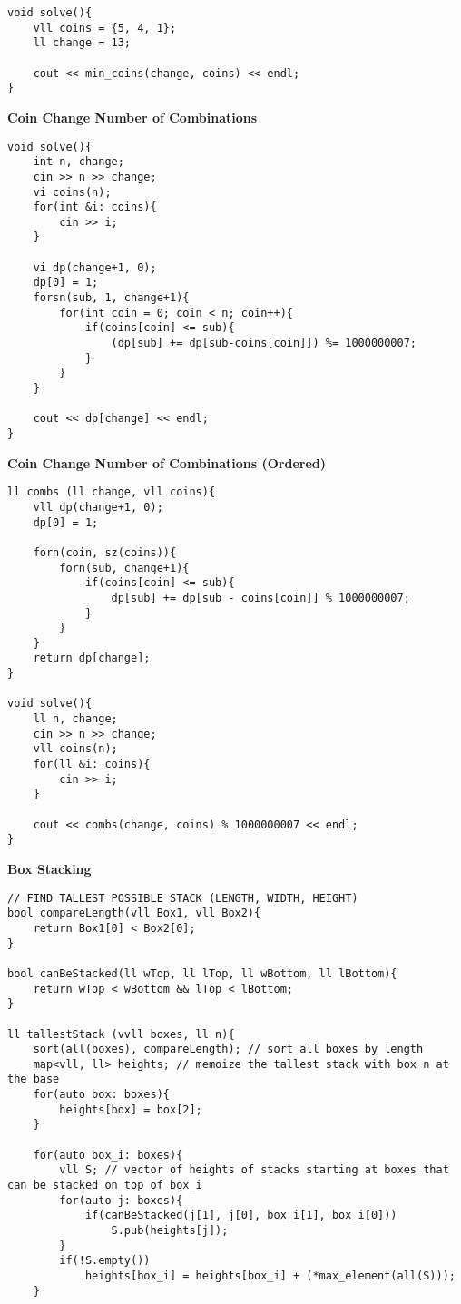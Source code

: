 \documentclass{article}
\begin{document}
\begin{multicols}{2}
\begin{lstlisting}
void solve(){
	vll coins = {5, 4, 1};
	ll change = 13; 
	
	cout << min_coins(change, coins) << endl;
}
\end{lstlisting}

\large
\huge\textbf{Coin Change Number of Combinations}
\large
\begin{lstlisting}
void solve(){
	int n, change;
	cin >> n >> change;
	vi coins(n);
	for(int &i: coins){
		cin >> i;
	}

	vi dp(change+1, 0);
	dp[0] = 1;
	forsn(sub, 1, change+1){
		for(int coin = 0; coin < n; coin++){
			if(coins[coin] <= sub){
				(dp[sub] += dp[sub-coins[coin]]) %= 1000000007;
			}
		}
	}

	cout << dp[change] << endl;
}
\end{lstlisting}

\large
\huge\textbf{Coin Change Number of Combinations (Ordered)}
\large
\begin{lstlisting}
ll combs (ll change, vll coins){
	vll dp(change+1, 0);
	dp[0] = 1;

	forn(coin, sz(coins)){
		forn(sub, change+1){
			if(coins[coin] <= sub){
				dp[sub] += dp[sub - coins[coin]] % 1000000007;
			}
		}
	}
	return dp[change];
}

void solve(){
	ll n, change;
	cin >> n >> change;
	vll coins(n);
	for(ll &i: coins){
		cin >> i;
	}

	cout << combs(change, coins) % 1000000007 << endl;
}
\end{lstlisting}

\large
\huge\textbf{Box Stacking}
\large
\begin{lstlisting}
// FIND TALLEST POSSIBLE STACK (LENGTH, WIDTH, HEIGHT)
bool compareLength(vll Box1, vll Box2){
	return Box1[0] < Box2[0];
}

bool canBeStacked(ll wTop, ll lTop, ll wBottom, ll lBottom){
	return wTop < wBottom && lTop < lBottom;
}

ll tallestStack (vvll boxes, ll n){
	sort(all(boxes), compareLength); // sort all boxes by length 
	map<vll, ll> heights; // memoize the tallest stack with box n at the base
	for(auto box: boxes){
		heights[box] = box[2];
	}

	for(auto box_i: boxes){
		vll S; // vector of heights of stacks starting at boxes that can be stacked on top of box_i
		for(auto j: boxes){
			if(canBeStacked(j[1], j[0], box_i[1], box_i[0]))
				S.pub(heights[j]);
		}
		if(!S.empty())
			heights[box_i] = heights[box_i] + (*max_element(all(S)));
	}


\end{lstlisting}
\end{multicols}
\end{document}
